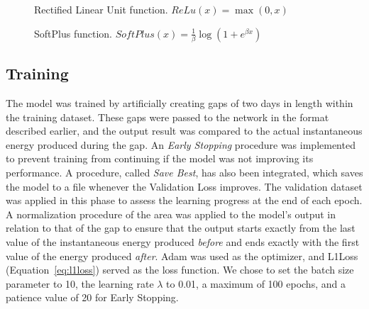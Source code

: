 \begin{minipage}[t]{0.5\textwidth}
	\begin{figure}[H]
		\centering
		\caption{Rectified Linear Unit function. $ReLu(x) = \max(0, x)$}
		\label{fig:relu}
	\end{figure}
\end{minipage}%
\hspace{.5cm}
\begin{minipage}[t]{0.5\textwidth}
	\begin{figure}[H]
		\centering
		\caption{SoftPlus function. $SoftPlus(x) = \frac{1}{\beta} \log(1+e^{\beta x})$}
		\label{fig:softplus}
	\end{figure}
\end{minipage}

\subsection{Training}
The model was trained by artificially creating gaps of two days in length within the
training dataset.
These gaps were passed to the network in the format described earlier,
and the output result was compared to the actual instantaneous energy produced during the gap.
An \textit{Early Stopping} procedure was implemented to prevent training from continuing if
the model was not improving its performance.
A procedure, called \textit{Save Best}, has also been integrated,
which saves the model to a file whenever the Validation Loss improves.
The validation dataset was applied in this phase to assess the learning progress at the end
of each epoch.
A normalization procedure of the area was applied to the model's output in relation to
that of the gap to ensure that the output starts exactly from the last value of the
instantaneous energy produced \textit{before} and ends exactly with the first value
of the energy produced \textit{after}. Adam was used as the optimizer,
and L1Loss (Equation~\ref{eq:l1loss}) served as the loss function.
We chose to set the batch size parameter to 10, the learning rate $\lambda$ to 0.01,
a maximum of 100 epochs, and a patience value of 20 for Early Stopping.

